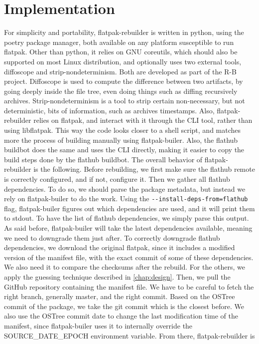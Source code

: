 \documentclass[a4paper,11pt,oneside]{report}
\theoremstyle{definition}
\newcommand{\sysname}{flatpak-rebuilder\xspace}
\newcommand{\fp}{flatpak\xspace}
\newcommand{\fh}{flathub\xspace}
\newcommand{\fb}{flatpak-builer\xspace}
\newcommand{\sde}{SOURCE\_DATE\_EPOCH\xspace}
\newcommand{\fhbb}{flathub buildbot\xspace}
\newcommand{\ot}{OSTree\xspace}
\begin{document}
\chapter{Implementation}
\label{chap:impl}

For simplicity and portability, \sysname is written in python, using the poetry
package manager, both available on any platform susceptible to run \fp. Other
than python, it relies on GNU coreutils, which should also be supported on most
Linux distribution, and optionally uses two external tools, diffoscope and
strip-nondeterminism. Both are developed as part of the R-B project. Diffoscope
is used to compute the difference between two artifacts, by going deeply inside
the file tree, even doing things such as diffing recursively archives.
Strip-nondeterminism is a tool to strip certain non-necessary, but not
deterministic, bits of information, such as archives timestamps. Also, \sysname
relies on \fp, and interact with it through the CLI tool, rather than using
libflatpak. This way the code looks closer to a shell script, and matches more
the process of building manually using \fb. Also, the \fhbb does the same and
uses the CLI directly, making it easier to copy the build steps done by the
\fhbb. The overall behavior of \sysname is the following. Before rebuilding, we
first make sure the \fh remote is correctly configured, and if not, configure
it. Then we gather all \fh dependencies. To do so, we should parse the package
metadata, but instead we rely on \fb to do the work. Using the
\verb|--install-deps-from=flathub| flag, \fb figures out which dependencies are
used, and it will print them to stdout. To have the list of \fh dependencies,
we simply parse this output. As said before, \fb will take the latest
dependencies available, meaning we need to downgrade them just after. To
correctly downgrade \fh dependencies, we download the original \fp, since it
includes a modified version of the manifest file, with the exact commit of some
of these dependencies. We also need it to compare the checksums after the
rebuild. For the others, we apply the guessing technique described in
\autoref{chap:design}. Then, we pull the GitHub repository containing the
manifest file. We have to be careful to fetch the right branch, generally
master, and the right commit. Based on the \ot commit of the package, we
take the git commit which is the closest before. We also use the \ot commit
date to change the last modification time of the manifest, since \fb uses it to
internally override the \sde environment variable. From there, \sysname is
\end{document}
